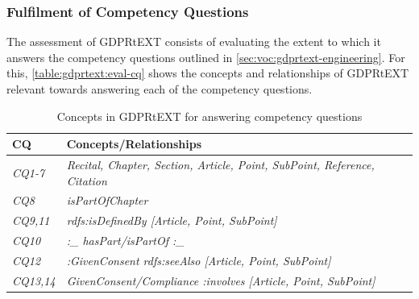 \subsubsection{Fulfilment of Competency Questions}
The assessment of GDPRtEXT consists of evaluating the extent to which it answers the competency questions outlined in \autoref{sec:voc:gdprtext-engineering}.
For this, \autoref{table:gdprtext:eval-cq} shows the concepts and relationships of GDPRtEXT relevant towards answering each of the competency questions.
\begin{table}[htbp]
\footnotesize
\centering
{}
\begin{tabularx}{\textwidth}{|l|X|}
\caption{Concepts in GDPRtEXT for answering competency questions} \\
\hline
\textbf{CQ} & \textbf{Concepts/Relationships} \\ \hline
\textit{CQ1-7} & \textit{Recital, Chapter, Section, Article, Point, SubPoint, Reference, Citation} \\ \hline
\textit{CQ8} & \textit{isPartOfChapter} \\ \hline
\textit{CQ9,11} & \textit{rdfs:isDefinedBy [Article, Point, SubPoint]} \\ \hline
\textit{CQ10} & \textit{:\_ hasPart/isPartOf :\_} \\ \hline
\textit{CQ12} & \textit{:GivenConsent rdfs:seeAlso [Article, Point, SubPoint]} \\ \hline
\textit{CQ13,14} & \textit{GivenConsent/Compliance :involves [Article, Point, SubPoint]} \\ \hline


\end{tabularx}
\end{table}
